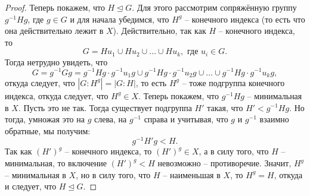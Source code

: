 \documentclass{article}
\begin{document}
\begin{proof}
    Теперь покажем, что $H \trianglelefteq G$. Для этого рассмотрим сопряжённую группу $g^{-1} H g$, где $g \in G$ и для начала убедимся, что $H^g$ -- конечного индекса (то есть что она действительно лежит в $X$). Действительно, так как $H$ -- конечного индекса, то
    \[
        G = H u_1 \cup H u_2 \cup \ldots \cup H u_k, \text{ где } u_i \in G.
    \]
    Тогда нетрудно увидеть, что
    \[
        G = g^{-1} G g = g^{-1} H g \cdot g^{-1} u_1 g \cup g^{-1} H g \cdot g^{-1} u_2 g \cup \ldots \cup g^{-1} H g \cdot g^{-1} u_k g,
    \]
    откуда следует, что $|G:H^g| = |G:H|$, то есть $H^g$ -- тоже подгруппа конечного индекса, откуда следует, что $H^g \in X$.
    Теперь покажем, что $g^{-1} H g$ -- минимальная в $X$. Пусть это не так. Тогда существует подгруппа $H'$ такая, что $H' < g^{-1} H g$. Но тогда, умножая это на $g$ слева, на $g^{-1}$ справа и учитывая, что $g$ и $g^{-1}$ взаимно обратные, мы получим: $$ g^{-1} H' g < H. $$ Так как $(H')^g$ -- конечного индекса, то $(H')^g \in X$, а в силу того, что $H$ -- минимальная, то включение $(H')^g < H$ невозможно -- противоречие.
    Значит, $H^g$ -- минимальная в $X$, но в силу того, что $H$ -- наименьшая в $X$, то $H^g = H$, откуда и следует, что $H \trianglelefteq G$.


\end{proof}
\end{document}

